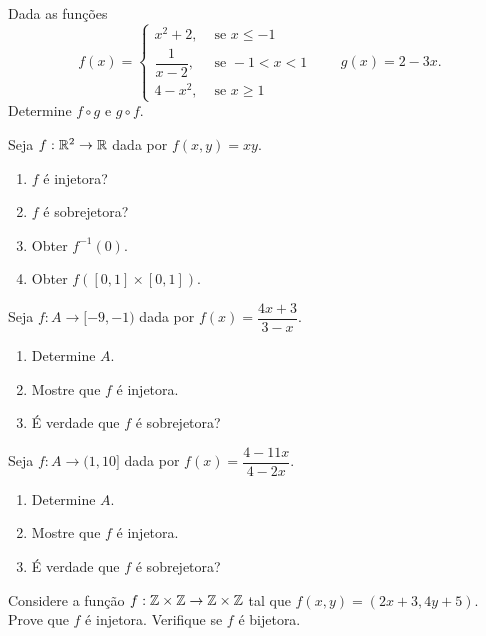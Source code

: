 \documentclass[12pt]{exam}
\begin{document}
\vspace{.3cm}

\questao{} Dada as fun\c{c}\~oes
\[
	f(x) = \begin{cases}
		x^2 + 2, & \mbox{ se } x \le -1\\
		\dfrac{1}{x - 2}, & \mbox{ se } -1 < x < 1\\
		4 - x^2, & \mbox{ se } x \ge 1
	\end{cases} \qquad g(x) = 2 - 3x.
\]
Determine $f\circ g$ e $g \circ f$.

\vspace{.3cm}

\questao{} Seja $f: \mathbb{R}^2 \to \mathbb{R}$ dada por $f(x,y) = xy$.
\begin{enumerate}[label={\alph*})]
	\item $f$ {\'e} injetora?
	\item $f$ {\'e} sobrejetora?
	\item Obter $f^{-1}({0})$.
	\item Obter $f([0,1]\times [0,1])$.
\end{enumerate}

\vspace{.3cm}

\questao{} Seja $f : A \to [-9,-1)$ dada por $f(x) = \dfrac{4x + 3}{3 - x}$.
\begin{enumerate}[label={\alph*})]
	\item Determine $A$.
	\item Mostre que $f$ \'e injetora.
	\item \'E verdade que $f$ \'e sobrejetora?
\end{enumerate}

\vspace{.3cm}

\questao{} Seja $f : A \to (1,10]$ dada por $f(x) = \dfrac{4 - 11x}{4 - 2x}$.
\begin{enumerate}[label={\alph*})]
	\item Determine $A$.
	\item Mostre que $f$ \'e injetora.
	\item \'E verdade que $f$ \'e sobrejetora?
\end{enumerate}

\vspace{.3cm}

\questao{} Considere a fun{\c c}{\~a}o $f : \mathbb{Z} \times \mathbb{Z} \to \mathbb{Z} \times \mathbb{Z}$ tal que $f(x,y) = (2x + 3, 4y + 5)$. Prove que $f$ {\'e} injetora. Verifique se $f$ {\'e} bijetora.
\end{document}
